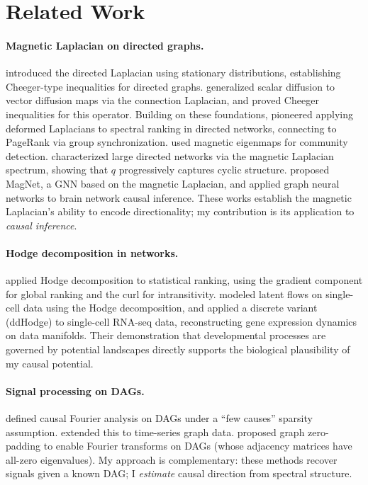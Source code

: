 \documentclass[twoside,11pt]{article}
\begin{document}
\section{Related Work}
\label{sec:related}

\paragraph{Magnetic Laplacian on directed graphs.}
\citet{Chung2005} introduced the directed Laplacian using stationary
distributions, establishing Cheeger-type inequalities for directed graphs.
\citet{Singer2012} generalized scalar diffusion to vector diffusion maps
via the connection Laplacian, and \citet{Bandeira2014} proved Cheeger
inequalities for this operator.  Building on these foundations,
\citet{Fanuel2017a} pioneered applying deformed Laplacians to spectral
ranking in directed networks, connecting to PageRank via group
synchronization.  \citet{Fanuel2017b} used magnetic eigenmaps for
community detection.  \citet{deResende2020} characterized large directed
networks via the magnetic Laplacian spectrum, showing that $q$
progressively captures cyclic structure.  \citet{Zhang2022} proposed
MagNet, a GNN based on the magnetic Laplacian, and \citet{Wein2024}
applied graph neural networks to brain network causal inference.
These works establish the
magnetic Laplacian's ability to encode directionality; my contribution
is its application to \emph{causal inference}.

\paragraph{Hodge decomposition in networks.}
\citet{Jiang2011} applied Hodge decomposition to statistical ranking,
using the gradient component for global ranking and the curl for
intransitivity.  \citet{Maehara2019} modeled latent flows on single-cell data using the
Hodge decomposition, and \citet{Maehara2025} applied a discrete variant
(ddHodge) to single-cell RNA-seq data, reconstructing gene expression
dynamics on data manifolds.  Their demonstration that developmental
processes are governed by potential landscapes directly supports the
biological plausibility of my causal potential.

\paragraph{Signal processing on DAGs.}
\citet{Seifert2023} defined causal Fourier analysis on DAGs under a
``few causes'' sparsity assumption.  \citet{Misiakos2024} extended this
to time-series graph data.  \citet{Stankovic2024} proposed graph
zero-padding to enable Fourier transforms on DAGs (whose adjacency
matrices have all-zero eigenvalues).  My approach is complementary:
these methods recover signals given a known DAG; I \emph{estimate}
causal direction from spectral structure.
\end{document}
